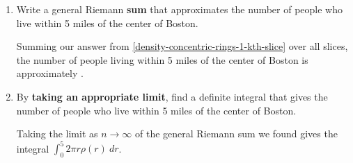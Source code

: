\documentclass[main]{subfiles}
\begin{document}
\begin{enumerate}
\begin{enumerate}
\begin{solution}
      Therefore, the number of people living in the $k$-th slice is approximately $\rho(r_k) \cdot 2 \pi r_k \Delta r = \boxed{2 \pi r_k
        \rho(r_k) \Delta r}$.
        
 Notice that we could have found the \textit{exact} area of the $k$-th slice by subtracting the area of the two disks that bound it, which would give $\pi(r_k)^2-\pi(r_{k-1})^2$=$\pi\big[(r_k)^2-(r_{k-1})^2\big]$. However, this expression does not explicitly contain $\Delta r$, which would make writing a Riemann sum in the next step much more difficult. So here, it is better to \textit{approximate} the area of the $k$-th slice with a rectangle than to find it exactly. Also, as our slices get thinner, the $k$-th ring will be better approximated by a rectangle, since the circumferences of the inner and outer circles will be closer in length, better resembling the equal parallel sides of a rectangle.
        
        
    \end{solution}

  \item
    \begin{problem}[\vfill]
      Write a general Riemann \textbf{sum} that approximates the number of
      people who live within 5 miles of the center of Boston.
    \end{problem}    

    \begin{solution}
      Summing our answer from \ref{density-concentric-rings-1-kth-slice}
      over all slices, the number of people living within 5 miles of the
      center of Boston is approximately .
    \end{solution}

  \item
    \begin{problem}[\vfill]
      By \textbf{taking an appropriate limit}, find a definite integral
      that gives the number of people who live within 5 miles of the
      center of Boston.
    \end{problem}

    \begin{solution}
      Taking the limit as $n \to \infty$ of the general Riemann sum we
      found gives the integral $\boxed{\int_0^5 2 \pi r \rho(r)~dr}$. 
    \end{solution}
  \end{enumerate}
  

\end{enumerate}
\end{document}

